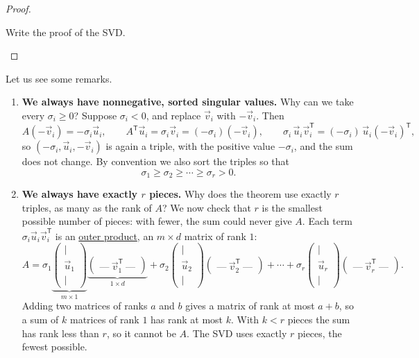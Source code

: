 \documentclass[a4paper,12pt,oneside]{report}
\begin{document}
\begin{proof}
\begin{todobox}
Write the proof of the SVD.
\end{todobox}
\end{proof}

Let us see some remarks.
\begin{enumerate}
\item \textbf{We always have nonnegative, sorted singular values.} Why can we
take every $\sigma_i\geq0$? Suppose $\sigma_i<0$,
and replace $\vec v_i$ with $-\vec v_i$. Then
\[
  A(-\vec v_i)=-\sigma_i\vec u_i,
  \qquad
  A^{\mathsf T}\vec u_i=\sigma_i\vec v_i=(-\sigma_i)(-\vec v_i),
  \qquad
  \sigma_i\,\vec u_i\vec v_i^{\mathsf T}
    =(-\sigma_i)\,\vec u_i(-\vec v_i)^{\mathsf T},
\]
so $(-\sigma_i,\vec u_i,-\vec v_i)$ is again a triple, with the
positive value $-\sigma_i$, and the sum does not change. By
convention we also sort the triples so that
\[
  \sigma_1\geq\sigma_2\geq\cdots\geq\sigma_r>0 .
\]

\item \textbf{We always have exactly $r$ pieces.} Why does the theorem use exactly $r$ triples, as many as the rank of
$A$? We now check that $r$ is the smallest possible number of pieces:
with fewer, the sum could never give $A$. Each term
$\sigma_i\vec u_i\vec v_i^{\mathsf T}$ is an
\hyperref[sec:matrix-outer-products]{outer product}, an $m\times d$
matrix of rank $1$:
\[
  A=\sigma_1
    \underbrace{\begin{pmatrix}\vert\\\vec u_1\\\vert\end{pmatrix}}_{m\times1}
    \underbrace{\begin{pmatrix}\text{---}\ \vec v_1^{\mathsf T}\ \text{---}\end{pmatrix}}_{1\times d}
   +\sigma_2
    \begin{pmatrix}\vert\\\vec u_2\\\vert\end{pmatrix}
    \begin{pmatrix}\text{---}\ \vec v_2^{\mathsf T}\ \text{---}\end{pmatrix}
   +\cdots+\sigma_r
    \begin{pmatrix}\vert\\\vec u_r\\\vert\end{pmatrix}
    \begin{pmatrix}\text{---}\ \vec v_r^{\mathsf T}\ \text{---}\end{pmatrix}.
\]
Adding two matrices of ranks $a$ and $b$ gives a matrix of rank at
most $a+b$, so a sum of $k$ matrices of rank $1$ has rank at most $k$.
With $k<r$ pieces the sum has rank less than $r$, so it cannot be $A$.
The SVD uses exactly $r$ pieces, the fewest possible.


\end{enumerate}
\end{document}
